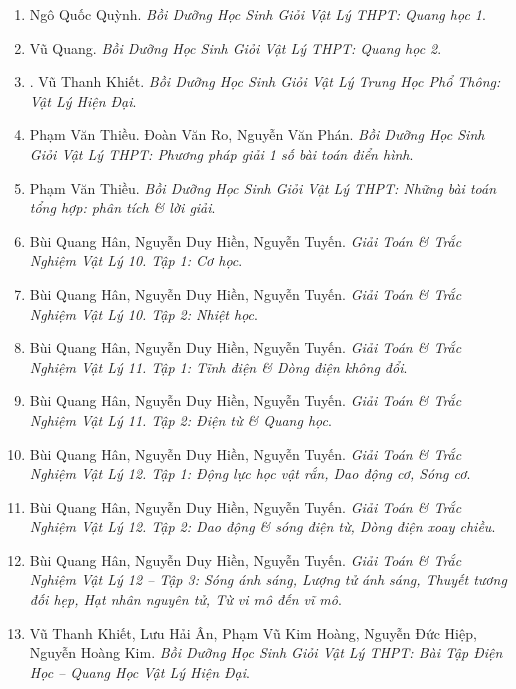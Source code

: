 \documentclass{article}
\begin{document}
\begin{enumerate}
	\item Ngô Quốc Quỳnh. {\it Bồi Dưỡng Học Sinh Giỏi Vật Lý THPT: Quang học 1}.\hfill{\sf[reading]}
	
	\item Vũ Quang. {\it Bồi Dưỡng Học Sinh Giỏi Vật Lý THPT: Quang học 2}.
	\item \cite{Khiet_Vat_Ly_hien_dai}. Vũ Thanh Khiết. {\it Bồi Dưỡng Học Sinh Giỏi Vật Lý Trung Học Phổ Thông: Vật Lý Hiện Đại}.\hfill{\sf[reading]}
	
	\item Phạm Văn Thiều. Đoàn Văn Ro, Nguyễn Văn Phán. {\it Bồi Dưỡng Học Sinh Giỏi Vật Lý THPT: Phương pháp giải 1 số bài toán điển hình}.
	
	\item Phạm Văn Thiều. {\it Bồi Dưỡng Học Sinh Giỏi Vật Lý THPT: Những bài toán tổng hợp: phân tích \& lời giải}.
	
	\item Bùi Quang Hân, Nguyễn Duy Hiền, Nguyễn Tuyến. {\it Giải Toán \& Trắc Nghiệm Vật Lý 10. Tập 1: Cơ học}.
	
	\item Bùi Quang Hân, Nguyễn Duy Hiền, Nguyễn Tuyến. {\it Giải Toán \& Trắc Nghiệm Vật Lý 10. Tập 2: Nhiệt học}.
	
	\item Bùi Quang Hân, Nguyễn Duy Hiền, Nguyễn Tuyến. {\it Giải Toán \& Trắc Nghiệm Vật Lý 11. Tập 1: Tĩnh điện \& Dòng điện không đổi}.
	
	\item Bùi Quang Hân, Nguyễn Duy Hiền, Nguyễn Tuyến. {\it Giải Toán \& Trắc Nghiệm Vật Lý 11. Tập 2: Điện từ \& Quang học}.
	
	\item Bùi Quang Hân, Nguyễn Duy Hiền, Nguyễn Tuyến. {\it Giải Toán \& Trắc Nghiệm Vật Lý 12. Tập 1: Động lực học vật rắn, Dao động cơ, Sóng cơ}.
	
	\item Bùi Quang Hân, Nguyễn Duy Hiền, Nguyễn Tuyến. {\it Giải Toán \& Trắc Nghiệm Vật Lý 12. Tập 2: Dao động \& sóng điện từ, Dòng điện xoay chiều}.
	
	\item Bùi Quang Hân, Nguyễn Duy Hiền, Nguyễn Tuyến. {\it Giải Toán \& Trắc Nghiệm Vật Lý 12 -- Tập 3: Sóng ánh sáng, Lượng tử ánh sáng, Thuyết tương đối hẹp, Hạt nhân nguyên tử, Từ vi mô đến vĩ mô}.
	
	\item Vũ Thanh Khiết, Lưu Hải Ân, Phạm Vũ Kim Hoàng, Nguyễn Đức Hiệp, Nguyễn Hoàng Kim. {\it Bồi Dưỡng Học Sinh Giỏi Vật Lý THPT: Bài Tập Điện Học -- Quang Học Vật Lý Hiện Đại}.
\end{enumerate}
\end{document}
